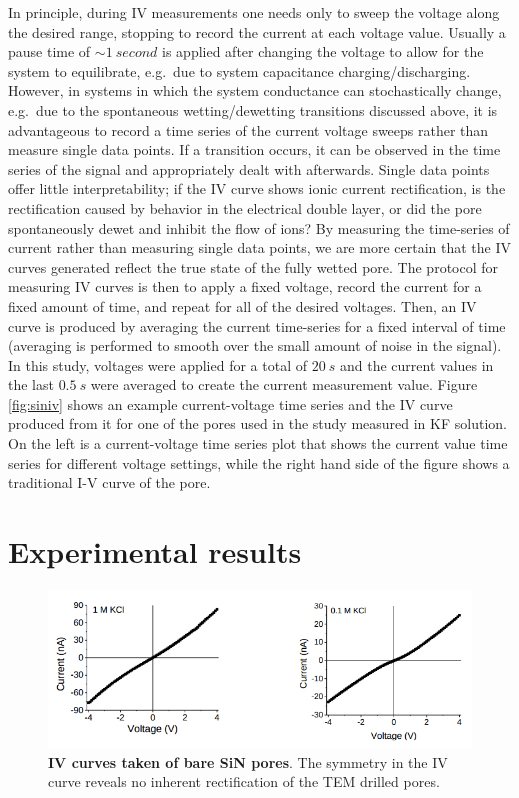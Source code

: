 			In principle, during IV measurements one needs only to sweep the voltage along the desired range, stopping to record the current at each voltage value. Usually a pause time of $\sim\SI{1}{second}$ is applied after changing the voltage to allow for the system to equilibrate, e.g.~due to system capacitance charging/discharging. However, in systems in which the system conductance can stochastically change, e.g.~due to the spontaneous wetting/dewetting transitions discussed above, it is advantageous to record a time series of the current voltage sweeps rather than measure single data points. If a transition occurs, it can be observed in the time series of the signal and appropriately dealt with afterwards. Single data points offer little interpretability; if the IV curve shows ionic current rectification, is the rectification caused by behavior in the electrical double layer, or did the pore spontaneously dewet and inhibit the flow of ions? By measuring the time-series of current rather than measuring single data points, we are more certain that the IV curves generated reflect the true state of the fully wetted pore. The protocol for measuring IV curves is then to apply a fixed voltage, record the current for a fixed amount of time, and repeat for all of the desired voltages. Then, an IV curve is produced by averaging the current time-series for a fixed interval of time (averaging is performed to smooth over the small amount of noise in the signal). In this study, voltages were applied for a total of $\SI{20}{s}$ and the current values in the last $\SI{0.5}{s}$ were averaged to create the current measurement value. Figure \ref{fig:siniv} shows an example current-voltage time series and the IV curve produced from it for one of the pores used in the study measured in KF solution. On the left is a current-voltage time series plot that shows the current value time series for different voltage settings, while the right hand side of the figure shows a traditional I-V curve of the pore.  
			
			
	\section{Experimental results}
	
		
		
		\begin{figure}
			\includegraphics[width=\textwidth]{sinsymm}
			\caption{\textbf{IV curves taken of bare SiN pores}. The symmetry in the IV curve reveals no inherent rectification of the TEM drilled pores.}
			\label{fig:sinsymm}
		\end{figure}
		
